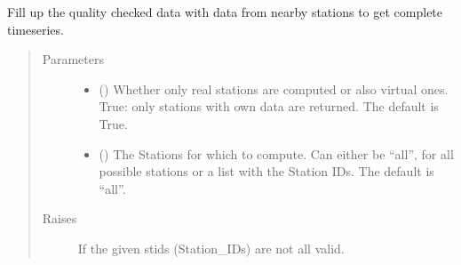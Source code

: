 \documentclass[letterpaper,10pt,english]{sphinxmanual}
\begin{document}
\begin{fulllineitems}
\begin{fulllineitems}
\label{\detokenize{weatherDB:weatherDB.stations.StationsBase.fillup}}
\sphinxAtStartPar
Fill up the quality checked data with data from nearby stations to get complete timeseries.
\begin{quote}\begin{description}
\item[{Parameters}] \leavevmode\begin{itemize}
\item {} 
\sphinxAtStartPar
{} (\sphinxstyleliteralemphasis{\sphinxupquote{, }}) \textendash{} Whether only real stations are computed or also virtual ones.
True: only stations with own data are returned.
The default is True.

\item {} 
\sphinxAtStartPar
{} (\sphinxstyleliteralemphasis{\sphinxupquote{, }}) \textendash{} The Stations for which to compute.
Can either be “all”, for all possible stations
or a list with the Station IDs.
The default is “all”.

\end{itemize}

\item[{Raises}] \leavevmode
\sphinxAtStartPar
{} \textendash{} If the given stids (Station\_IDs) are not all valid.

\end{description}\end{quote}

\end{fulllineitems}



\end{fulllineitems}
\end{document}
